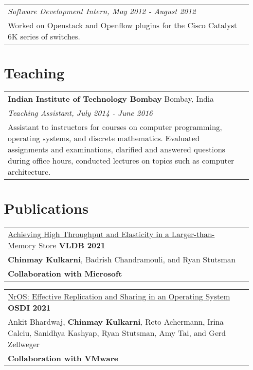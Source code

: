\documentclass[margin,line]{res}
\begin{document}
\begin{resume}
\vspace{-7pt}
\begin{tabular}{@{}p{5.5in}p{4in}}
{\small\em Software Development Intern, May 2012 - August 2012}\\
{\small Worked on Openstack and Openflow plugins for the
Cisco Catalyst 6K series of switches.}
\end{tabular}

\section{\sc Teaching}
\begin{tabular}{@{}p{5.5in}p{4in}}
{\bf Indian Institute of Technology Bombay} \dotfill Bombay, India\\
{\small\em Teaching Assistant, July 2014 - June 2016}\\
{\small Assistant to instructors for courses on computer programming,
operating systems, and discrete mathematics. Evaluated assignments and
examinations, clarified and answered questions during office hours,
conducted lectures on topics such as computer architecture.}
\end{tabular}

\section{\sc Publications}
 \begin{tabular}{@{}p{5.5in}p{4in}}
 \href{https://microsoft.github.io/FASTER/}{Achieving High Throughput and
 Elasticity in a Larger-than-Memory Store} \hfill
 {\small\bf VLDB 2021}\\
 {\small {\bf Chinmay Kulkarni}, Badrish Chandramouli, and Ryan
 Stutsman}\\
 {\small\bf Collaboration with Microsoft}\\
 \end{tabular}

 \vspace{-7pt}
 \begin{tabular}{@{}p{5.5in}p{4in}}
 \href{https://research.vmware.com/projects/bespin}{NrOS: Effective
 Replication and Sharing in an Operating System} \hfill
 {\small\bf OSDI 2021}\\
 {\small Ankit Bhardwaj, {\bf Chinmay Kulkarni}, Reto Achermann, Irina
  Calciu, Sanidhya Kashyap, Ryan Stutsman, Amy Tai, and Gerd Zellweger}\\
 {\small\bf Collaboration with VMware}\\
 \end{tabular}


\end{resume}
\end{document}
